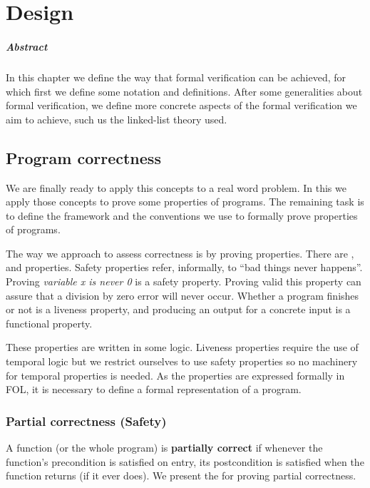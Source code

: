 \chapter{Design\label{chap:design}}

\paragraph{Abstract} 

In this chapter we define the way that formal verification can be achieved, for which first we define some notation and definitions.
%
After some generalities about formal verification, we define more concrete aspects of the formal verification we aim to achieve, such us the linked-list theory used.
%
%
%
\section{Program correctness}
%
We are finally ready to apply this concepts to a real word problem. In this \thisworkm we apply those concepts to prove some properties of programs.
%
The remaining task is to define the framework and the conventions we use to formally prove  properties of programs.

The way we approach to assess correctness is by proving properties. 
%
There are ,  and  properties. 
%
Safety properties refer, informally, to “bad things never happens”. Proving \textit{ variable x is never 0 } is a safety property. 
%
Proving valid this property can assure that a division by zero error will never occur. 
%
Whether a program finishes or not is a liveness property, and producing an output for a concrete input is a functional property. 

These properties are written in some logic. 
%
Liveness properties require the use of temporal logic but we restrict ourselves to use safety properties so no machinery for temporal properties is needed.
%
As the properties are expressed formally in \gls{FOL}, it is necessary to define a formal representation of a program.


\label{def:SPL}



\subsection{Partial correctness (Safety)}

A function (or the whole program) is \textbf{partially correct} if whenever the function's precondition is satisfied on entry, its postcondition is satisfied when the function returns (if it ever does).
%
We present the  for proving partial correctness.


